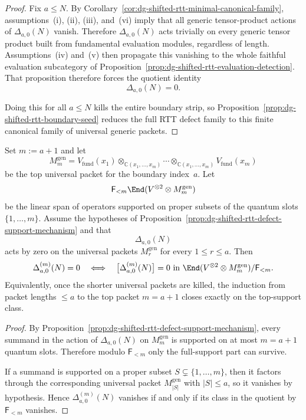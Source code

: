 \begin{proof}
Fix $a \le N$.  By
Corollary~\ref{cor:dg-shifted-rtt-minimal-canonical-family},
assumptions~\textup{(i)}, \textup{(ii)}, \textup{(iii)},
and~\textup{(vi)} imply that all generic tensor-product actions of
$\Delta_{a,0}(N)$ vanish.
Therefore $\Delta_{a,0}(N)$ acts trivially on every generic tensor
product built from fundamental evaluation modules, regardless of
length.  Assumptions~\textup{(iv)} and~\textup{(v)} then propagate
this vanishing to the whole faithful evaluation subcategory of
Proposition~\ref{prop:dg-shifted-rtt-evaluation-detection}.  That
proposition therefore forces the quotient identity
\[
\Delta_{a,0}(N)=0.
\]

Doing this for all $a\le N$ kills the entire boundary strip, so
Proposition~\ref{prop:dg-shifted-rtt-boundary-seed} reduces the full
RTT defect family to this finite canonical family of universal generic
packets.
\end{proof}

\begin{proposition}
\label{prop:dg-shifted-rtt-top-packet-induction}
Set $m:=a+1$ and let
\[
M_m^{\mathrm{gen}}
=
V_{\mathrm{fund}}(x_1)\otimes_{\mathbb{C}(x_1,\dots,x_m)}\cdots
\otimes_{\mathbb{C}(x_1,\dots,x_m)}V_{\mathrm{fund}}(x_m)
\]
be the top universal packet for the boundary index~$a$.  Let
\[
\mathsf{F}_{<m}\End(V^{\otimes 2}\otimes M_m^{\mathrm{gen}})
\]
be the linear span of operators supported on proper subsets of the
quantum slots $\{1,\dots,m\}$.  Assume the hypotheses of
Proposition~\ref{prop:dg-shifted-rtt-defect-support-mechanism} and that
\[
\Delta_{a,0}(N)
\]
acts by zero on the universal packets $M_r^{\mathrm{gen}}$ for every
$1\le r\le a$.  Then
\[
\Delta^{(m)}_{a,0}(N)=0
\quad\Longleftrightarrow\quad
\bigl[\Delta^{(m)}_{a,0}(N)\bigr]=0
\ \text{in}\ 
\End(V^{\otimes 2}\otimes M_m^{\mathrm{gen}})/\mathsf{F}_{<m}.
\]
Equivalently, once the shorter universal packets are killed, the
induction from packet lengths $\le a$ to the top packet $m=a+1$
closes exactly on the top-support class.
\end{proposition}

\begin{proof}
By
Proposition~\ref{prop:dg-shifted-rtt-defect-support-mechanism}, every
summand in the action of $\Delta_{a,0}(N)$ on $M_m^{\mathrm{gen}}$ is
supported on at most $m=a+1$ quantum slots.  Therefore modulo
$\mathsf{F}_{<m}$ only the full-support part can survive.

If a summand is supported on a proper subset
$S\subsetneq\{1,\dots,m\}$, then it factors through the corresponding
universal packet $M_{|S|}^{\mathrm{gen}}$ with $|S|\le a$, so it
vanishes by hypothesis.  Hence
$\Delta^{(m)}_{a,0}(N)$ vanishes if and only if its class in the
quotient by $\mathsf{F}_{<m}$ vanishes.
\end{proof}

